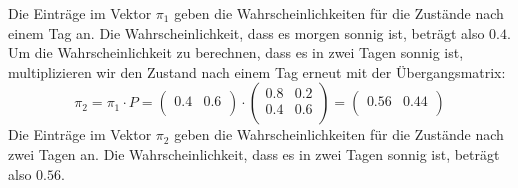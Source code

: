 \begin{myexample}
Die Einträge im Vektor $\pi_1$ geben die Wahrscheinlichkeiten für die Zustände nach einem Tag an. Die Wahrscheinlichkeit, dass es morgen sonnig ist, beträgt also $0.4$. Um die Wahrscheinlichkeit zu berechnen, dass es in zwei Tagen sonnig ist, multiplizieren wir den Zustand nach einem Tag erneut mit der Übergangsmatrix:
\[
    \pi_2 = \pi_1 \cdot P =
    \begin{pmatrix}
        0.4 & 0.6 \\
    \end{pmatrix}
    \cdot
    \begin{pmatrix}
        0.8 & 0.2 \\
        0.4 & 0.6 \\
    \end{pmatrix}
    =
    \begin{pmatrix}
        0.56 & 0.44 \\
    \end{pmatrix}
\]
Die Einträge im Vektor $\pi_2$ geben die Wahrscheinlichkeiten für die Zustände nach zwei Tagen an. Die Wahrscheinlichkeit, dass es in zwei Tagen sonnig ist, beträgt also $0.56$.
\end{myexample}

